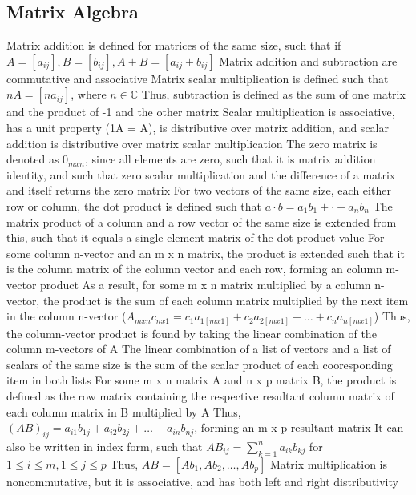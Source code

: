\documentclass[11 pt, twoside]{article}
\newenvironment{outline*}
{
	\begin{outline}[enumerate]
	}
	{\end{outline}
}
\begin{document}
\subsection{Matrix Algebra}
\begin{outline*}
\1 Matrix addition is defined for matrices of the same size, such that if $A = [a_{ij}], B = [b_{ij}], A + B = [a_{ij} + b_{ij}]$
\2 Matrix addition and subtraction are commutative and associative
\1 Matrix scalar multiplication is defined such that $nA = [na_{ij}]$, where $n \in \mathbb{C}$ 
\2 Thus, subtraction is defined as the sum of one matrix and the product of -1 and the other matrix
\2 Scalar multiplication is associative, has a unit property (1A = A), is distributive over matrix addition, and scalar addition is distributive over matrix scalar multiplication
\1 The zero matrix is denoted as $0_{m x n}$, since all elements are zero, such that it is matrix addition identity, and such that zero scalar multiplication and the difference of a matrix and itself returns the zero matrix
\1 For two vectors of the same size, each either row or column, the dot product is defined such that $a \cdot b = a_1b_1 + \cdot + a_nb_n$
\2 The matrix product of a column and a row vector of the same size is extended from this, such that it equals a single element matrix of the dot product value
\2 For some column n-vector and an m x n matrix, the product is extended such that it is the column matrix of the column vector and each row, forming an column m-vector product
\3 As a result, for some m x n matrix multiplied by a column n-vector, the product is the sum of each column matrix multiplied by the next item in the column n-vector ($A_{m x n}c_{n x 1} = c_1a_{1 [m x 1]} + c_2a_{2 [m x 1]} + \dots + c_na_{n [m x 1]}$)
\3 Thus, the column-vector product is found by taking the linear combination of the column m-vectors of A
\4 The linear combination of a list of vectors and a list of scalars of the same size is the sum of the scalar product of each cooresponding item in both lists
\2 For some m x n matrix A and n x p matrix B, the product is defined as the row matrix containing the respective resultant column matrix of each column matrix in B multiplied by A
\3 Thus, $(AB)_{ij} = a_{i1}b_{1j} + a_{i2}b_{2j} + \dots + a_{in}b_{nj}$, forming an m x p resultant matrix
\3 It can also be written in index form, such that $AB_{ij} = \sum_{k=1}^n a_{ik}b_{kj}$ for $1 \leq i \leq m, 1 \leq j \leq p$
\3 Thus, $AB = [Ab_1, Ab_2, \dots, Ab_p]$
\2 Matrix multiplication is noncommutative, but it is associative, and has both left and right distributivity

\end{outline*}
\end{document}
